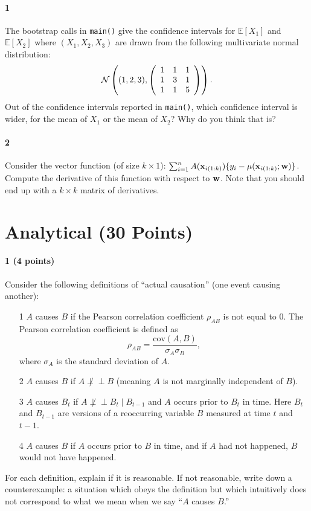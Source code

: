 \documentclass[11pt]{article}
\def\ci{\perp\!\!\!\perp}
\begin{document}
\paragraph{1}
The bootstrap calls in \texttt{main()} give the confidence intervals for $\mathbb{E}[X_1]$ and $\mathbb{E}[X_2]$ where $(X_1,X_2,X_3)$ are drawn from the following
multivariate normal distribution:
\[
{\cal N}\left( (1,2,3), \left(\begin{array}{ccc} 1 & 1 & 1 \\ 1 & 3 & 1 \\ 1 & 1 & 5 \end{array} \right) \right).
\]
Out of the confidence intervals reported in \texttt{main()}, which confidence interval is wider, for the mean of $X_1$ or the mean of $X_2$?
Why do you think that is?

\paragraph{2}
Consider the vector function (of size $k \times 1$): $\sum_{i=1}^n A({\bf x}_{i(1:k)}) \{ y_i - \mu({\bf x}_{i(1:k)}; {\bf w})\}$.
Compute the derivative of this function with respect to ${\bf w}$.  Note that you should end up with a $k \times k$ matrix of derivatives.

\section{Analytical (30 Points)}

\paragraph{1 (4 points)}
Consider the following definitions of ``actual causation'' (one event causing another):
\begin{itemize}
\item[1] $A$ causes $B$ if the Pearson correlation coefficient $\rho_{AB}$ is not equal to $0$.  The Pearson correlation coefficient is defined as
\[
\rho_{AB} = \frac{\text{cov}(A,B)}{\sigma_A \sigma_B},
\]
where $\sigma_A$ is the standard deviation of $A$.

\item[2] $A$ causes $B$ if $A \not\ci B$ (meaning $A$ is not marginally independent of $B$).
\item[3] $A$ causes $B_t$ if $A \not\ci B_t \mid B_{t-1}$ and $A$ occurs prior to $B_t$ in time.  Here $B_t$ and $B_{t-1}$ are versions of a reoccurring variable $B$ measured at time $t$ and $t-1$.
\item[4] $A$ causes $B$ if $A$ occurs prior to $B$ in time, and if $A$ had not happened, $B$ would not have happened.
\end{itemize}
For each definition, explain if it is reasonable.  If not reasonable, write down a counterexample: a situation which obeys the definition but which intuitively does not correspond to what we mean when we say ``$A$ causes $B$.''
\end{document}
